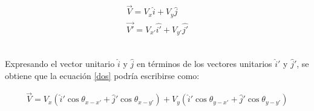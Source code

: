\documentclass[12pt,letterpaper, twoside, openany]{article}
\begin{document}
%
\begin{align}
	\overset{\rightarrow}{V} = V_x \hat{i} + V_y \hat{j} \label{dos}  \\
	\overset{\rightarrow}{V'} = V_{x'} \hat{i'} + V_{y'} \hat{j'} \label{tres}
\end{align}\

Expresando el vector unitario $\hat{i}$ y $\hat{j}$ en términos de los vectores unitarios $\hat{i}'$ y $\hat{j}'$, se obtiene que la ecuación \ref{dos} podría escribirse como: 
%

\begin{align*}
	\overset{\rightarrow}{V} = V_x \left( \hat{i}' \cos \theta_{x-x'} + \hat{j}' \cos \theta_{x-y'} \right) + V_y \left( \hat{i}' \cos \theta_{y-x'} + \hat{j}' \cos \theta_{y-y'} \right)
\end{align*} \
\end{document}
